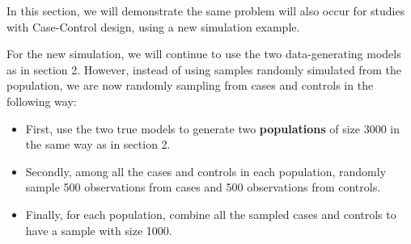 \documentclass[
]{article}
\providecommand{\tightlist}{%
  \setlength{\itemsep}{0pt}\setlength{\parskip}{0pt}}
\begin{document}
In this section, we will demonstrate the same problem will also occur
for studies with Case-Control design, using a new simulation example.

For the new simulation, we will continue to use the two data-generating
models as in section 2. However, instead of using samples randomly
simulated from the population, we are now randomly sampling from cases
and controls in the following way:

\begin{itemize}
\tightlist
\item
  First, use the two true models to generate two \textbf{populations} of
  size 3000 in the same way as in section 2.
\item
  Secondly, among all the cases and controls in each population,
  randomly sample 500 observations from cases and 500 observations from
  controls.
\item
  Finally, for each population, combine all the sampled cases and
  controls to have a sample with size 1000.
\end{itemize}
\end{document}
